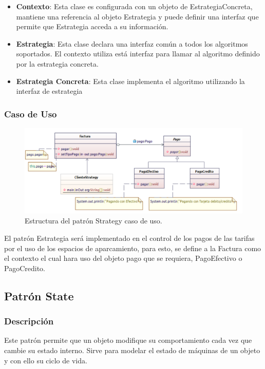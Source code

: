\begin{itemize}
	\item \textbf{Contexto}: Esta clase es configurada con un objeto de EstrategiaConcreta, mantiene una referencia al objeto Estrategia y puede definir una interfaz que permite que Estrategia acceda a su información.
	\item \textbf{Estrategia}: Esta clase declara una interfaz común a todos los algoritmos soportados. El contexto utiliza está interfaz para llamar al algoritmo definido por la estrategia concreta.
	\item \textbf{Estrategia Concreta}: Esta clase implementa el algoritmo utilizando la interfaz de estrategia
\end{itemize}


\subsubsection{Caso de Uso}

\begin{figure}[th!]
	\centering
	\includegraphics[width=.7\linewidth]{imagenes/Patrones/Strategy_caso.pdf}
	\caption{Estructura del patrón Strategy caso de uso.\cite{gof}}	
\end{figure}

El patrón Estrategia será implementado en el control de los pagos de las tarifas por el uso de los espacios de aparcamiento, para esto, se define a la Factura como el contexto el cual hara uso del objeto pago que se requiera, PagoEfectivo o PagoCredito.


\subsection{Patrón State}

\subsubsection{Descripción}
Este patrón permite que un objeto modifique su comportamiento cada vez que cambie su estado interno. Sirve para modelar el estado de máquinas de un objeto y con ello su ciclo de vida.

